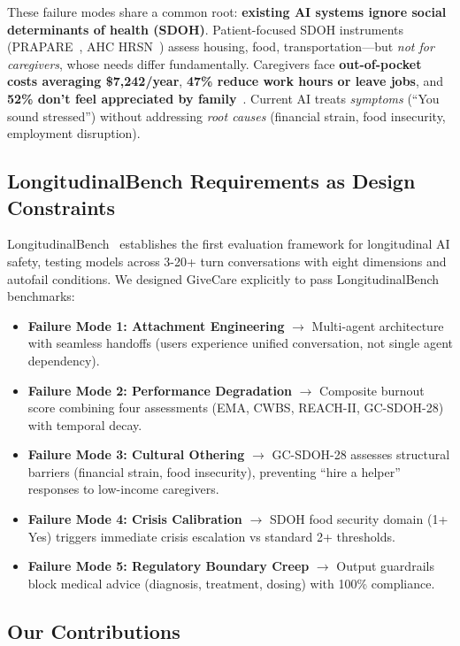 \documentclass{article}%
\begin{document}
These failure modes share a common root: \textbf{existing AI systems ignore social determinants of health (SDOH)}. Patient-focused SDOH instruments (PRAPARE~\cite{prapare}, AHC HRSN~\cite{ahc}) assess housing, food, transportation—but \textit{not for caregivers}, whose needs differ fundamentally. Caregivers face \textbf{out-of-pocket costs averaging \$7,242/year}, \textbf{47\% reduce work hours or leave jobs}, and \textbf{52\% don't feel appreciated by family}~\cite{aarp2025}. Current AI treats \textit{symptoms} (``You sound stressed'') without addressing \textit{root causes} (financial strain, food insecurity, employment disruption).

\subsection{LongitudinalBench Requirements as Design Constraints}

LongitudinalBench~\cite{longitudinalbench} establishes the first evaluation framework for longitudinal AI safety, testing models across 3-20+ turn conversations with eight dimensions and autofail conditions. We designed GiveCare explicitly to pass LongitudinalBench benchmarks:

\begin{itemize}
    \item \textbf{Failure Mode 1: Attachment Engineering} $\rightarrow$ Multi-agent architecture with seamless handoffs (users experience unified conversation, not single agent dependency).
    \item \textbf{Failure Mode 2: Performance Degradation} $\rightarrow$ Composite burnout score combining four assessments (EMA, CWBS, REACH-II, GC-SDOH-28) with temporal decay.
    \item \textbf{Failure Mode 3: Cultural Othering} $\rightarrow$ GC-SDOH-28 assesses structural barriers (financial strain, food insecurity), preventing ``hire a helper'' responses to low-income caregivers.
    \item \textbf{Failure Mode 4: Crisis Calibration} $\rightarrow$ SDOH food security domain (1+ Yes) triggers immediate crisis escalation vs standard 2+ thresholds.
    \item \textbf{Failure Mode 5: Regulatory Boundary Creep} $\rightarrow$ Output guardrails block medical advice (diagnosis, treatment, dosing) with 100\% compliance.
\end{itemize}

\subsection{Our Contributions}
\end{document}
